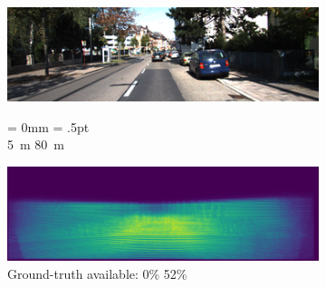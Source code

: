 \documentclass[lang=english]{tumarxivarticle}
\begin{document}
\begin{figure}
  \centering
  \scriptsize

  \begin{subfigure}[t]{.48\linewidth}
    \includegraphics[width=\linewidth]{figures/example_kitti_rgb}
    \vspace{-1mm}
    \caption{}
    \label{subfig:example_kitti_rgb}
  \end{subfigure}
  \hfill
  \begin{subfigure}[t]{.48\linewidth}
    \scriptsize
    \fboxsep = 0mm  %
    \fboxrule= .5pt %
     \\
    \scriptsize
    \SI{5}{\meter} \hfill
    \hfill \SI{80}{\meter}
    \vspace{-0.1cm} %
    \caption{}
    \label{fig:example_kitti_gt}
  \end{subfigure}

  \vspace{0.15cm}

  \begin{subfigure}{\linewidth}
    \includegraphics[width=\linewidth]{figures/kitti_depth_distribution} \\
    \scriptsize
    Ground-truth available: \hfill 0\%
    52\%
    \vspace{-0.1cm} %
    \caption{}
    \label{subfig:depth_distribution_kitti_spatial}
  \end{subfigure}


\end{figure}
\end{document}
